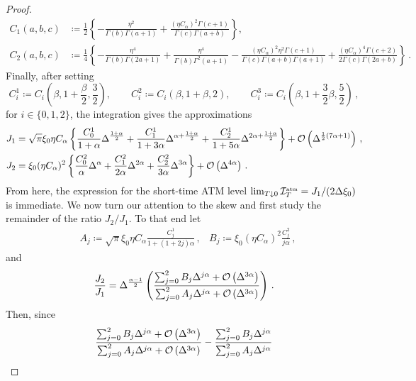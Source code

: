 \begin{proof}
{\begin{equation}
\begin{aligned}
    C_1(a,b,c) &\coloneqq \frac12\left\{-\frac{\eta^2}{\Gamma(b)\Gamma(a+1)} + \frac{(\eta C_{\alpha})^2 \Gamma(c+1)}{\Gamma(c)\Gamma(a+b)}\right\}, \\
    C_2(a,b,c) &\coloneqq \frac14 \left\{ -\frac{\eta^4}{\Gamma(b)\Gamma(2a+1)} +\frac{\eta^4}{\Gamma(b)\Gamma^2(a+1)} - \frac{(\eta C_{\alpha})^2 \eta^2 \Gamma(c+1)}{\Gamma(c)\Gamma(a+b)\Gamma(a+1)} + \frac{(\eta C_{\alpha})^4 \Gamma(c+2)}{2\Gamma(c)\Gamma(2a+b)}\right\}\,.
\end{aligned}
\end{equation}}%
Finally, after setting
\begin{equation}\label{eq:C_ATMSkewTaylor}
    C_i^1 \coloneqq C_i\left(\beta, 1+\frac\beta2, \frac32\right), \qquad
        C_i^2 \coloneqq C_i\left(\beta, 1+\beta, 2\right),\qquad
        C_i^3 \coloneqq C_i\left(\beta, 1+\frac32\beta, \frac52\right)\,,
\end{equation}
for $i\in\{0,1,2\}$, the integration gives the approximations
\begin{align*}
    J_1 &= \sqrt{\pi} \xi_0 \eta C_{\alpha} \left\{ \frac{C_0^1}{1+\alpha} 
 \Delta^{\frac{1+\alpha}{2}} + \frac{C_1^1}{1+3\alpha} 
 \Delta^{\alpha+\frac{1+\alpha}{2}}  + \frac{C_2^1}{1+5\alpha} 
 \Delta^{2\alpha+\frac{1+\alpha}{2}}\right\} + \mathcal{O}\left(\Delta^{\frac12(7\alpha+1)}\right)\,, \\
    J_2 &= \xi_0 (\eta C_{\alpha})^2 \left\{ \frac{C_0^2}{\alpha} 
 \Delta^{\alpha} + \frac{C_1^2}{2\alpha} 
 \Delta^{2\alpha}  + \frac{C_2^2}{3\alpha} 
 \Delta^{3\alpha}\right\} + \mathcal{O}\left(\Delta^{4\alpha}\right)\,.
\end{align*}
From here, the expression for the short-time ATM level $\lim_{T\downarrow 0}\mathcal{I}^{\textup{\tiny atm}}_T=J_1/(2\Delta \xi_0)$ is immediate. We now turn our attention to the skew and first study the remainder of the ratio $J_2/J_1$. To that end let 
\begin{align}\label{eq:AB_ATMSkewTaylor}
& A_j \coloneqq \sqrt{\pi} \xi_0 \eta C_{\alpha} \frac{C^1_{j}}{1+(1+2j)\alpha}\,, & B_j \coloneqq \xi_0 (\eta C_{\alpha})^2\frac{C_j^2}{j\alpha}\,,
\end{align}
and
\begin{align*}
    \frac{J_2}{J_1} = \Delta^{\frac{\alpha-1}2}\left(\frac{\sum_{j=0}^2 B_j \Delta^{j\alpha} + \mathcal{O}\left(\Delta^{3\alpha}\right)}{\sum_{j=0}^2 A_j \Delta^{j\alpha} + \mathcal{O}\left(\Delta^{3\alpha}\right)}\right)\,.
\end{align*}
Then, since
\begin{align*}
    \frac{\sum_{j=0}^2 B_j \Delta^{j\alpha} + \Oo\left(\Delta^{3\alpha}\right)}{\sum_{j=0}^2 A_j \Delta^{j\alpha} + \Oo\left(\Delta^{3\alpha}\right)} - \frac{\sum_{j=0}^2 B_j \Delta^{j\alpha}}{\sum_{j=0}^2 A_j \Delta^{j\alpha}} 

\end{align*}
\end{proof}
